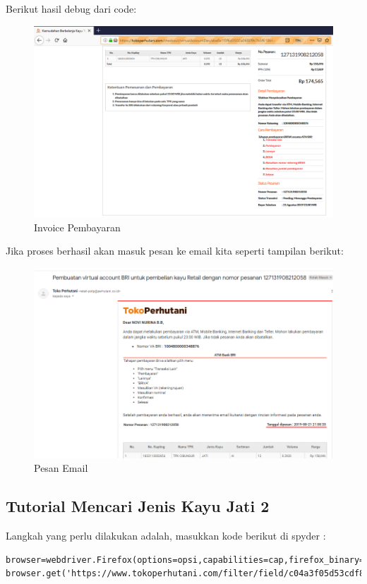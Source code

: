 Berikut hasil debug dari code: 
\begin{figure}[h]
	\centering
	\includegraphics[scale=0.25]{figures/invoicee}
	\caption{Invoice Pembayaran}
\end{figure}

Jika proses berhasil akan masuk pesan ke email kita seperti tampilan berikut:
\begin{figure}[h]
	\centering
	\includegraphics[scale=0.30]{figures/emailbayar}
	\caption{Pesan Email}
\end{figure}

\newpage
\subsection {Tutorial Mencari Jenis Kayu Jati 2}
Langkah yang perlu dilakukan adalah, masukkan kode berikut di spyder :
\begin{verbatim}
browser=webdriver.Firefox(options=opsi,capabilities=cap,firefox_binary=binary)
browser.get('https://www.tokoperhutani.com/filter/field/c04a3f05d53cdf8f8ac5cf643ba2504bd2f46bd0bb9a60877d640d51d96a6af5#')
\end{verbatim}

